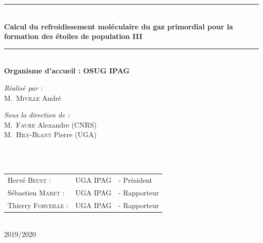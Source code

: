 \documentclass[10pt, a4paper]{report}
\numberwithin{equation}{subsection}
\begin{document}
\begin{titlepage}
\begin{center}
\rule{\linewidth}{0.3mm} \\[0.4cm]
{ \huge \bfseries\color{blue!70!black} Calcul du refroidissement moléculaire du gaz primordial pour la formation des étoiles de population III \\[0.4cm] }
\rule{\linewidth}{0.3mm} \\[1cm]
{\large \bfseries Organisme d'accueil : OSUG IPAG}\\[1cm]
\noindent
\begin{minipage}{0.4\textwidth}
  \begin{flushleft} \large
    \emph{\color{orange!80!black}Réalisé par :}\\
    M.~\textsc{Miville} André\\
  \end{flushleft}
\end{minipage}%
\begin{minipage}{0.5\textwidth}
  \begin{flushright} \large
    \emph{\color{orange!80!black}Sous la direction de :} \\
    M.~\textsc{Faure} Alexandre (CNRS)\\
    M.~\textsc{Hily-Blant} Pierre (UGA)\\
  \end{flushright}
\end{minipage}\\[1cm]

\\[0.5cm]

\color{black}
\centering
\begin{tabular}{lll}
\large Hervé \textsc{Beust} : & \large UGA IPAG & \large - Président \\[0.1cm]
\large Sébastien  \textsc{Maret} : & \large UGA IPAG & \large - Rapporteur \\[0.1cm]
\large Thierry \textsc{Forveille} : & \large UGA IPAG & \large - Rapporteur
\end{tabular}

\vfill

{\large \color{orange!80!black}{Année universitaire}\\ \color{blue!80!black}2019/2020}

\end{center}
\end{titlepage}
\end{document}
